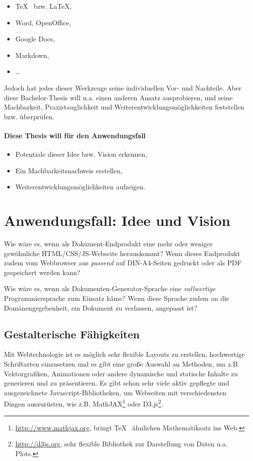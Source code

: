 \begin{itemize}
  \item \TeX~ bzw. \LaTeX,
  \item Word, OpenOffice,
  \item Google Docs,
  \item Markdown,
  \item \ldots
\end{itemize}

Jedoch hat jedes dieser Werkzeuge seine individuellen Vor- und Nachteile.
Aber diese Bachelor-Thesis will u.a. einen anderen Ansatz ausprobieren, und
seine Machbarkeit, Praxistauglichkeit und Weiterentwicklungsmöglichkeiten
feststellen bzw. überprüfen.

\paragraph{Diese Thesis will für den Anwendungsfall}

\begin{itemize}
  \item Potentiale dieser Idee bzw. Vision erkennen,
  \item Ein Machbarkeitsnachweis erstellen,
  \item Weiterentwicklungsmöglichkeiten aufzeigen.
\end{itemize}

\section{Anwendungsfall: Idee und Vision}\label{sec-idee}

Wie wäre es, wenn als Dokument-Endprodukt eine mehr oder weniger
gewöhnliche HTML/CSS/JS-Webseite herauskommt?
Wenn dieses Endprodukt zudem vom Webbrowser aus \emph{passend} auf
DIN-A4-Seiten gedruckt oder als PDF gespeichert werden kann?

Wie wäre es, wenn als Dokumenten-\-Generator-\-Sprache eine \emph{vollwertige}
Programmiersprache zum Einsatz käme? Wenn diese Sprache zudem an die
Domänen\-gege\-ben\-heit, ein Dokument zu verfassen,
angepasst ist?

\subsection{Gestalterische Fähigkeiten}

Mit Webtechnologie ist es möglich sehr flexible Layouts zu erstellen,
hochwertige Schriftarten einzusetzen und es gibt eine große Auswahl an
Methoden, um z.B. Vektorgrafiken, Animationen oder
andere dynamische und statische Inhalte zu generieren und zu
präsentieren. Es gibt schon sehr viele aktiv gepflegte und ausgezeichnete
Javascript-Bibliotheken,
um Webseiten mit verschiedensten Dingen auszurüsten,
wie z.B. MathJAX\footnote{\url{http://www.mathjax.org}, bringt \TeX~ ähnlichen
Mathematiksatz ins Web.} oder
D3.js\footnote{\url{http://d3js.org}, sehr flexible Bibliothek zur Darstellung
von Daten u.a. Plots.}.

